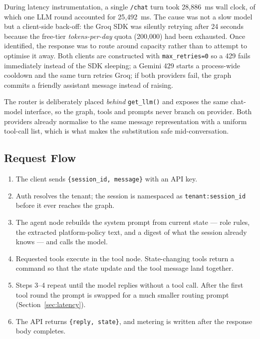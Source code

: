 \documentclass[11pt,a4paper]{article}
\newcommand{\code}[1]{\texttt{\small #1}}
\begin{document}
During latency instrumentation, a single \code{/chat} turn took 28{,}886~ms
wall clock, of which one LLM round accounted for 25{,}492~ms. The cause was
not a slow model but a client-side back-off: the Groq SDK was silently
retrying after 24 seconds because the free-tier \emph{tokens-per-day} quota
(200{,}000) had been exhausted. Once identified, the response was to route
around capacity rather than to attempt to optimise it away. Both clients are
constructed with \code{max\_retries=0} so a 429 fails immediately instead of
the SDK sleeping; a Gemini 429 starts a process-wide cooldown and the same
turn retries Groq; if both providers fail, the graph commits a friendly
assistant message instead of raising.

The router is deliberately placed \emph{behind} \code{get\_llm()} and exposes
the same chat-model interface, so the graph, tools and prompts never branch on
provider. Both providers already normalise to the same message representation
with a uniform tool-call list, which is what makes the substitution safe
mid-conversation.

\subsection{Request Flow}

\begin{enumerate}[itemsep=2pt,topsep=4pt]
\item The client sends \code{\{session\_id, message\}} with an API key.
\item Auth resolves the tenant; the session is namespaced as
      \code{tenant:session\_id} before it ever reaches the graph.
\item The agent node rebuilds the system prompt from current state --- role
      rules, the extracted platform-policy text, and a digest of what the
      session already knows --- and calls the model.
\item Requested tools execute in the tool node. State-changing tools return a
      command so that the state update and the tool message land together.
\item Steps 3--4 repeat until the model replies without a tool call. After the
      first tool round the prompt is swapped for a much smaller routing prompt
      (Section~\ref{sec:latency}).
\item The API returns \code{\{reply, state\}}, and metering is written after
      the response body completes.
\end{enumerate}
\end{document}
